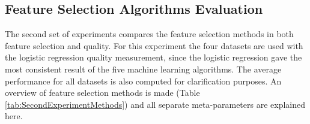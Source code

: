 	\subsection{Feature Selection Algorithms Evaluation}
	\label{subsec:FeatureSelectionAlgorithmsEvaluation}

	The second set of experiments compares the feature selection methods in both feature selection and quality. For this experiment the four datasets are used with the logistic regression quality measurement, since the logistic regression gave the most consistent result of the five machine learning algorithms. The average performance for all datasets is also computed for clarification purposes. An overview of feature selection methods is made (Table \ref{tab:SecondExperimentMethods}) and all separate meta-parameters are explained here.
	
